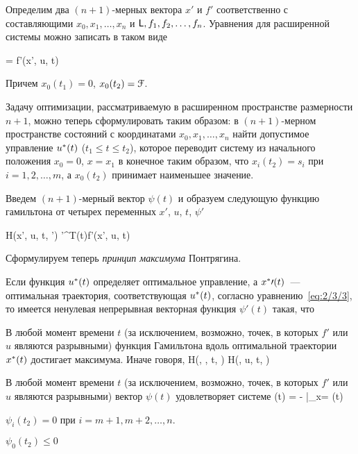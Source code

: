Определим два $(n+1)$-мерных вектора $x'$ и $f'$ соответственно с составляющими $x_0, x_1, \ldots, x_n$ и $\mathsf{L}, f_1, f_2, \ldots, f_n$. Уравнения для расширенной системы можно записать в таком виде

     = f'(x', u, t) 
\eeq

Причем $x_0(t_1) = 0$, $x_0(t_2) = \mathcal{F}$.

Задачу оптимизации, рассматриваемую в расширенном пространстве размерности $n+1$, можно теперь сформулировать таким образом: в $(n+1)$-мерном пространстве состояний с координатами $x_0, x_1, \ldots, x_n$ найти допустимое управление $u^{*}(t)$ ($t_1 \leqslant t \leqslant t_2$), которое переводит систему из начального положения $x_0 = 0$, $x = x_1$ в конечное таким образом, что $x_i(t_2) = s_i$ при $i = 1, 2, \ldots, m$, а $x_0(t_2)$ принимает наименьшее значение.

Введем $(n+1)$-мерный вектор $\psi(t)$ и образуем следующую функцию гамильтона от четырех переменных $x'$, $u$, $t$, $\psi'$

    H(x', u, t, \psi') \eqdef \psi'^T(t)f'(x', u, t) 
\eeq

Сформулируем теперь \emph{принцип максимума} Понтрягина.

	Если функция $u^{*}(t)$ определяет оптимальное управление, а $x^{*}\prime(t)$~--- оптимальная траектория, соответствующая $u^{*}(t)$, согласно уравнению~\ref{eq:2/3/3}, то имеется ненулевая непрерывная векторная функция $\psi\prime(t)$ такая, что
	\benum
		\item
			В любой момент времени $t$ (за исключением, возможно, точек, в которых $f'$ или $u$ являются разрывными) функция Гамильтона вдоль оптимальной траектории $x^{*}(t)$ достигает максимума. Иначе говоря,
			\beqn
				H(\optX\prime, \optU, t, \psi\prime) \geqslant H(\optX\prime, u, t, \psi\prime) \text{.}
			\eeqn
		
		\item
			В любой момент времени $t$ (за исключением, возможно, точек, в которых $f'$ или $u$ являются разрывными) вектор $\psi(t)$ удовлетворяет системе
			\beq{eq:2/3/5}
				\dot{\psi}\prime(t) = - \biggm|_{x\prime = \optX(t)} 
			\eeq
		
		\item
			$\psi_i(t_2) = 0$ при $i= m+1, m+2, \ldots, n$.
		
		\item
			$\psi_0(t_2) \leqslant 0$
	\eenum
\eteo

